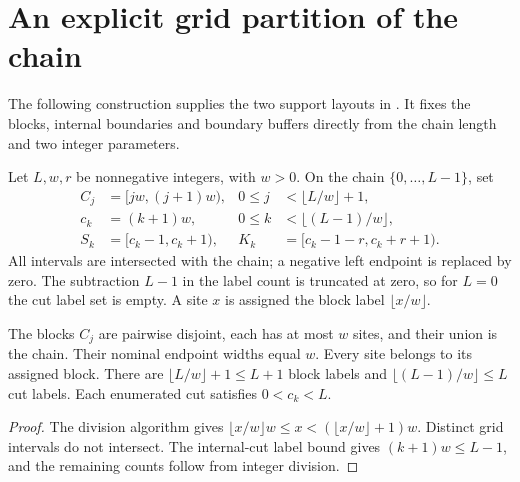 \section{An explicit grid partition of the chain}
\label{sec:huang_chain_grid}

The following construction supplies the two support layouts in
\cite[Figure 2]{Osborne2006Dynamics}. It fixes the blocks, internal boundaries
and boundary buffers directly from the chain length and two integer parameters.

\begin{definition}
    \label{def:huang_chain_grid}
    \leanok
    Let $L,w,r$ be nonnegative integers, with $w>0$. On the chain
    $\{0,\ldots,L-1\}$, set
    \begin{align*}
        C_j & =[jw,(j+1)w),       & 0\le j & <\lfloor L/w\rfloor+1,  \\
        c_k & =(k+1)w,            & 0\le k & <\lfloor(L-1)/w\rfloor, \\
        S_k & =[c_k-1,c_k+1),     &
        K_k & =[c_k-1-r,c_k+r+1).
    \end{align*}
    All intervals are intersected with the chain; a negative left endpoint is
    replaced by zero. The subtraction $L-1$ in the label count is truncated
    at zero, so for $L=0$ the cut label set is empty.
    A site $x$ is assigned the block label $\lfloor x/w\rfloor$.
\end{definition}

\begin{lemma}
    \label{thm:huang_chain_grid_blocks}
    \leanok
    The blocks $C_j$ are pairwise disjoint, each has at most $w$ sites, and
    their union is the chain. Their nominal endpoint widths equal $w$.
    Every site belongs to its assigned block. There are
    $\lfloor L/w\rfloor+1\le L+1$ block labels and
    $\lfloor(L-1)/w\rfloor\le L$ cut labels.
    Each enumerated cut satisfies $0<c_k<L$.
\end{lemma}
\begin{proof}
    \leanok
    The division algorithm gives
    $\lfloor x/w\rfloor w\le x<(\lfloor x/w\rfloor+1)w$.
    Distinct grid intervals do not intersect. The internal-cut label bound
    gives $(k+1)w\le L-1$, and the remaining counts follow from integer division.
\end{proof}

